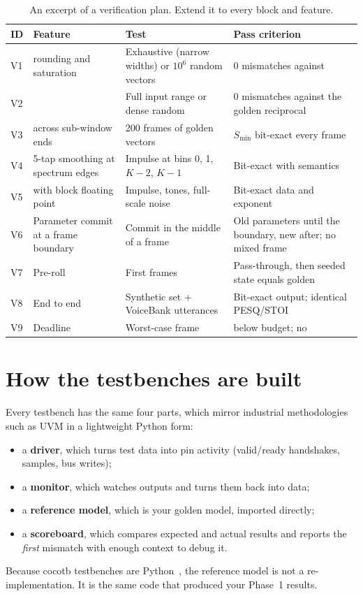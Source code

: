 \begin{table}[htbp]
\centering\footnotesize
\caption{An excerpt of a verification plan. Extend it to every block and feature.}
\label{tab:verif:plan}
\begin{tabularx}{\textwidth}{@{}lLLL@{}}
\toprule
ID & Feature & Test & Pass criterion \\
\midrule
V1 &  rounding and saturation & Exhaustive (narrow widths) or $10^6$ random vectors & 0 mismatches against  \\
V2 &  & Full input range or dense random & 0 mismatches against the golden reciprocal \\
V3 &  across sub-window ends & 200 frames of golden vectors & $S_\text{min}$ bit-exact every frame \\
V4 & 5-tap smoothing at spectrum edges & Impulse at bins 0, 1, $K-2$, $K-1$ & Bit-exact with  semantics \\
V5 &  with block floating point & Impulse, tones, full-scale noise & Bit-exact data and exponent \\
V6 & Parameter commit at a frame boundary & Commit in the middle of a frame & Old parameters until the boundary, new after; no mixed frame \\
V7 & Pre-roll & First  frames & Pass-through, then seeded state equals golden \\
V8 & End to end & Synthetic set + VoiceBank utterances & Bit-exact output; identical PESQ/STOI \\
V9 & Deadline & Worst-case frame &  below budget; no  \\
\bottomrule
\end{tabularx}
\end{table}

\section{How the testbenches are built}\label{sec:verif:arch}

Every testbench has the same four parts, which mirror industrial methodologies
such as UVM in a lightweight Python form:
\begin{itemize}
  \item a \textbf{driver}, which turns test data into pin activity (valid/ready
        handshakes, samples, bus writes);
  \item a \textbf{monitor}, which watches outputs and turns them back into data;
  \item a \textbf{reference model}, which is your golden model, imported
        directly;
  \item a \textbf{scoreboard}, which compares expected and actual results and
        reports the \emph{first} mismatch with enough context to debug it.
\end{itemize}
Because cocotb testbenches are Python~\cite{cocotb}, the reference model is
not a re-implementation. It is the same code that produced your Phase~1 results.

